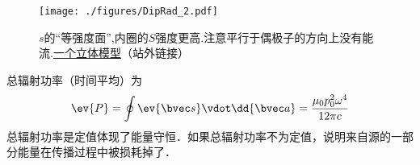 \begin{figure}[ht]
\centering
\texttt{[image: ./figures/DipRad\_2.pdf]}
\caption{$s$的“等强度面”,内圈的$S$强度更高.注意平行于偶极子的方向上没有能流.\href{https://www.geogebra.org/m/semmtxm5}{一个立体模型}（站外链接）} \label{DipRad_fig2}
\end{figure}
总辐射功率（时间平均）为
\begin{equation}
\ev{P} = \oint \ev{\bvec s} \vdot \dd{\bvec a} = \frac{\mu_0 p_0^2 \omega^4}{12\pi c}
\end{equation}
总辐射功率是定值体现了能量守恒．如果总辐射功率不为定值，说明来自源的一部分能量在传播过程中被损耗掉了．
